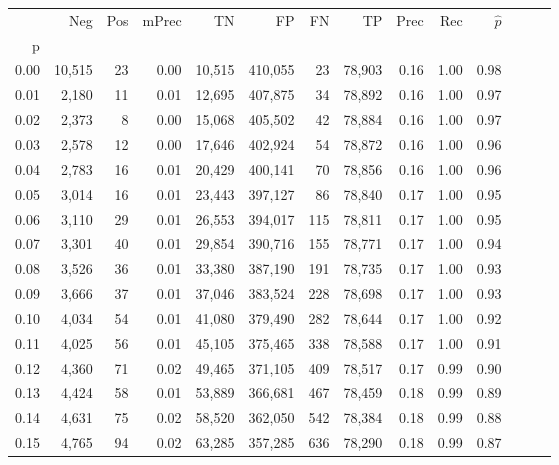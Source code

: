 \begin{tabular}{rrrrrrrrrrrrrr}
\toprule
{} &     Neg &    Pos & mPrec &       TN &       FP &      FN &      TP &  Prec &   Rec & $\hat{p}$ \\
p    &         &        &       &          &          &         &         &       &       &           \\
\midrule
0.00 &  10,515 &     23 &  0.00 &   10,515 &  410,055 &      23 &  78,903 &  0.16 &  1.00 &      0.98 \\
0.01 &   2,180 &     11 &  0.01 &   12,695 &  407,875 &      34 &  78,892 &  0.16 &  1.00 &      0.97 \\
0.02 &   2,373 &      8 &  0.00 &   15,068 &  405,502 &      42 &  78,884 &  0.16 &  1.00 &      0.97 \\
0.03 &   2,578 &     12 &  0.00 &   17,646 &  402,924 &      54 &  78,872 &  0.16 &  1.00 &      0.96 \\
0.04 &   2,783 &     16 &  0.01 &   20,429 &  400,141 &      70 &  78,856 &  0.16 &  1.00 &      0.96 \\
0.05 &   3,014 &     16 &  0.01 &   23,443 &  397,127 &      86 &  78,840 &  0.17 &  1.00 &      0.95 \\
0.06 &   3,110 &     29 &  0.01 &   26,553 &  394,017 &     115 &  78,811 &  0.17 &  1.00 &      0.95 \\
0.07 &   3,301 &     40 &  0.01 &   29,854 &  390,716 &     155 &  78,771 &  0.17 &  1.00 &      0.94 \\
0.08 &   3,526 &     36 &  0.01 &   33,380 &  387,190 &     191 &  78,735 &  0.17 &  1.00 &      0.93 \\
0.09 &   3,666 &     37 &  0.01 &   37,046 &  383,524 &     228 &  78,698 &  0.17 &  1.00 &      0.93 \\
0.10 &   4,034 &     54 &  0.01 &   41,080 &  379,490 &     282 &  78,644 &  0.17 &  1.00 &      0.92 \\
0.11 &   4,025 &     56 &  0.01 &   45,105 &  375,465 &     338 &  78,588 &  0.17 &  1.00 &      0.91 \\
0.12 &   4,360 &     71 &  0.02 &   49,465 &  371,105 &     409 &  78,517 &  0.17 &  0.99 &      0.90 \\
0.13 &   4,424 &     58 &  0.01 &   53,889 &  366,681 &     467 &  78,459 &  0.18 &  0.99 &      0.89 \\
0.14 &   4,631 &     75 &  0.02 &   58,520 &  362,050 &     542 &  78,384 &  0.18 &  0.99 &      0.88 \\
0.15 &   4,765 &     94 &  0.02 &   63,285 &  357,285 &     636 &  78,290 &  0.18 &  0.99 &      0.87 \\

\end{tabular}

